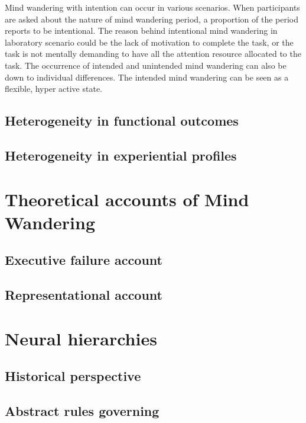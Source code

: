 Mind wandering with intention can occur in various scenarios. When participants are asked about the nature of mind wandering period, a proportion of the period reports to be intentional. The reason behind intentional mind wandering in laboratory scenario could be the lack of motivation to complete the task, or the task is not mentally demanding to have all the attention resource allocated to the task. The occurrence of intended and unintended mind wandering can also be down to individual differences. 
The intended mind wandering can be seen as a flexible, hyper active state. 

\subsection{Heterogeneity in functional outcomes}

\subsection{Heterogeneity in experiential profiles }


\section{Theoretical accounts of Mind Wandering}
\subsection{Executive failure account}
\subsection{Representational account}

\section{Neural hierarchies}

\subsection{Historical perspective}

\subsection{Abstract rules governing}

